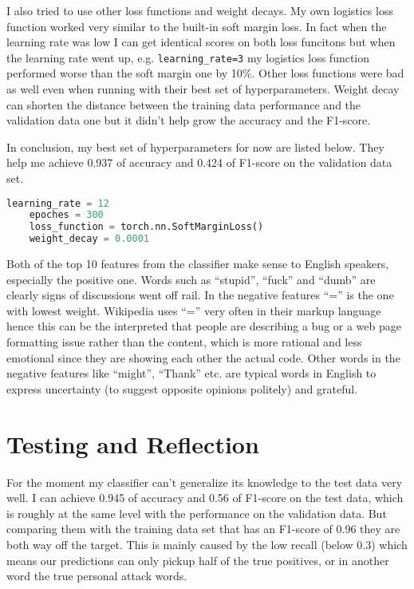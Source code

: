\documentclass[11pt]{article} %
\begin{document}
I also tried to use other loss functions and weight decays. My own logistics loss function worked very similar to the built-in soft margin loss. In fact when the learning rate was low I can get identical scores on both loss funcitons but when the learning rate went up, e.g. \verb|learning_rate=3| my logistics loss function performed worse than the soft margin one by 10\%. Other loss functions were bad as well even when running with their best set of hyperparameters. Weight decay can shorten the distance between the training data performance and the validation data one but it didn't help grow the accuracy and the F1-score.

In conclusion, my best set of hyperparameters for now are listed below. They help me achieve 0.937 of accuracy and 0.424 of F1-score on the validation data set.

\begin{lstlisting}[language=Python]
    learning_rate = 12
    epoches = 300
    loss_function = torch.nn.SoftMarginLoss()
    weight_decay = 0.0001
\end{lstlisting}

Both of the top 10 features from the classifier make sense to English speakers, especially the positive one. Words such as ``stupid'', ``fuck'' and ``dumb'' are clearly signs of discussions went off rail. In the negative features ``='' is the one with lowest weight. Wikipedia uses ``='' very often in their markup language hence this can be the interpreted that people are describing a bug or a web page formatting issue rather than the content, which is more rational and less emotional since they are showing each other the actual code. Other words in the negative features like ``might'', ``Thank'' etc. are typical words in English to express uncertainty (to suggest opposite opinions politely) and grateful.

\section{Testing and Reflection}

For the moment my classifier can't generalize its knowledge to the test data very well. I can achieve 0.945 of accuracy and 0.56 of F1-score on the test data, which is roughly at the same level with the performance on the validation data. But comparing them with the training data set that has an F1-score of 0.96 they are both way off the target. This is mainly caused by the low recall (below 0.3) which means our predictions can only pickup half of the true positives, or in another word the true personal attack words.
\end{document}
